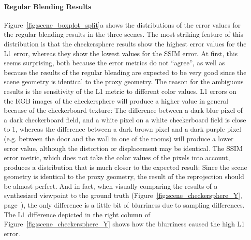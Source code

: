 \paragraph{Regular Blending Results}
Figure~\ref{fig:scene_boxplot_split}a shows the distributions of the error values for the regular blending results in the three scenes. The most striking feature of this distribution is that the checkersphere results show the highest error values for the L1 error, whereas they show the lowest values for the SSIM error. At first, this seems surprising, both because the error metrics do not ``agree'', as well as because the results of the regular blending are expected to be very good since the scene geometry is identical to the proxy geometry. The reason for the ambiguous results is the sensitivity of the L1 metric to different color values. L1 errors on the RGB images of the checkersphere will produce a higher value in general because of the checkerboard texture:
The difference between a dark blue pixel of a dark checkerboard field, and a white pixel on a white checkerboard field is close to 1, whereas the difference between a dark brown pixel and a dark purple pixel (e.g. between the door and the wall in one of the rooms) will produce a lower error value, although the distortion or displacement may be identical. The SSIM error metric, which does not take the color values of the pixels into account, produces a distribution that is much closer to the expected result: Since the scene geometry is identical to the proxy geometry, the result of the reprojection should be almost perfect. And in fact, when visually comparing the results of a synthesized viewpoint to the ground truth (Figure~\ref{fig:scene_checkersphere_Y}, page~\pageref{fig:scene_checkersphere_Y}), the only difference is a little bit of blurriness due to sampling differences. The L1 difference depicted in the right column of Figure~\ref{fig:scene_checkersphere_Y} shows how the blurriness caused the high L1 error.

